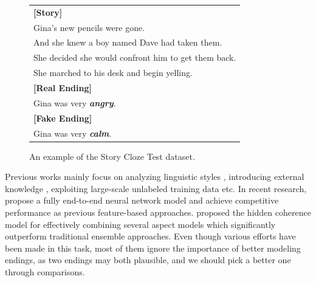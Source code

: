 \documentclass[letterpaper]{article} %
\begin{document}
\begin{figure}[tbp]
\centering
        \begin{tabular}{l}
        \toprule
	{\bf [Story]} \\ 
	Gina's new pencils were gone. \\ 
	And she knew a boy named Dave had taken them. \\
	She decided she would confront him to get them back. \\
	She marched to his desk and begin yelling. \\
        \midrule
	{\bf [Real Ending]} \\
	Gina was very {\bf \em angry}. \\
	{\bf [Fake Ending]} \\
	Gina was very {\bf \em calm}. \\
        \bottomrule
        \end{tabular}
\caption{\label{sct-example} An example of the Story Cloze Test dataset.}
\end{figure}

Previous works mainly focus on analyzing linguistic styles \cite{schwartz-etal-2017}, introducing external knowledge \cite{lin-etal-2017}, exploiting large-scale unlabeled training data \cite{bingning-etal-2017} etc.
In recent research, \citeauthor{cai-etal-2017}  propose a fully end-to-end neural network model and achieve competitive performance as previous feature-based approaches. 
\citeauthor{chaturvedi-etal-2017}  proposed the hidden coherence model for effectively combining several aspect models which significantly outperform traditional ensemble approaches.
Even though various efforts have been made in this task, most of them ignore the importance of better modeling endings, as two endings may both plausible, and we should pick a better one through comparisons.
\end{document}
